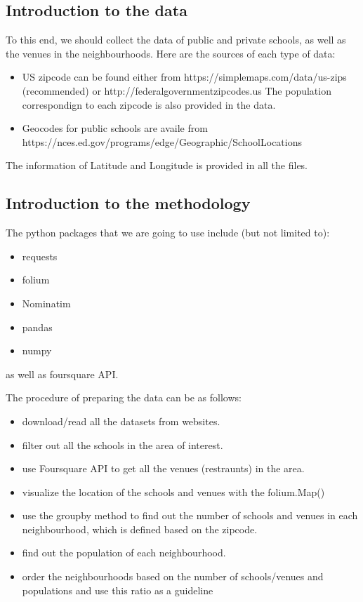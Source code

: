\documentclass[11pt]{article}
\providecommand{\tightlist}{%
      \setlength{\itemsep}{0pt}\setlength{\parskip}{0pt}}
\begin{document}
\subsection{Introduction to the data}\label{introduction-to-the-data}

To this end, we should collect the data of public and private schools,
as well as the venues in the neighbourhoods. Here are the sources of
each type of data:

\begin{itemize}
\item
  US zipcode can be found either from
  https://simplemaps.com/data/us-zips (recommended) or
  http://federalgovernmentzipcodes.us The population correspondign to
  each zipcode is also provided in the data.
\item
  Geocodes for public schools are availe from
  https://nces.ed.gov/programs/edge/Geographic/SchoolLocations
\end{itemize}

The information of Latitude and Longitude is provided in all the files.

\subsection{Introduction to the
methodology}\label{introduction-to-the-methodology}

The python packages that we are going to use include (but not limited
to):

\begin{itemize}
\tightlist
\item
  requests
\item
  folium
\item
  Nominatim
\item
  pandas
\item
  numpy
\end{itemize}

as well as foursquare API.

The procedure of preparing the data can be as follows:

\begin{itemize}
\tightlist
\item
  download/read all the datasets from websites.
\item
  filter out all the schools in the area of interest.
\item
  use Foursquare API to get all the venues (restraunts) in the area.
\item
  visualize the location of the schools and venues with the folium.Map()
\item
  use the groupby method to find out the number of schools and venues in
  each neighbourhood, which is defined based on the zipcode.
\item
  find out the population of each neighbourhood.
\item
  order the neighbourhoods based on the number of schools/venues and
  populations and use this ratio as a guideline
\end{itemize}
\end{document}
